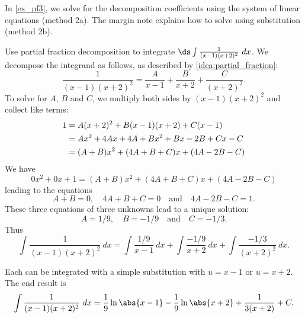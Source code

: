 In \autoref{ex_pf3}, we solve for the decomposition coefficients using the system of linear equations (method 2a). The margin note explains how to solve using substitution (method 2b).

\begin{example}\label{ex_pf3}
Use partial fraction decomposition to integrate $\ds\int\frac{1}{(x-1)(x+2)^2}\ dx$.
\solution
We decompose the integrand as follows, as described by \autoref{idea:partial_fraction}:
\begin{equation}\label{eq:decomp3}
 \frac{1}{(x-1)(x+2)^2} = \frac{A}{x-1} + \frac{B}{x+2} + \frac{C}{(x+2)^2}.
\end{equation}
To solve for $A$, $B$ and $C$, we multiply both sides by $(x-1)(x+2)^2$ and collect like terms:
%
%
\begin{align}
	1
	&= A(x+2)^2 + B(x-1)(x+2) + C(x-1)\label{eq:pf3}\\
	&= Ax^2+4Ax+4A + Bx^2 + Bx-2B + Cx-C \notag \\
	&= (A+B)x^2 + (4A+B+C)x + (4A-2B-C)\notag
\end{align}
We have
\[0x^2+0x+ 1 = (A+B)x^2 + (4A+B+C)x + (4A-2B-C)\]
leading to the equations 
\[A+B = 0, \quad 4A+B+C = 0 \quad \text{and} \quad 4A-2B-C = 1.\]
These three equations of three unknowns lead to a unique solution:
\[A = 1/9,\quad B = -1/9 \quad \text{and} \quad C = -1/3.\]
Thus 
\[\int\frac{1}{(x-1)(x+2)^2}\ dx = \int \frac{1/9}{x-1}\ dx + \int \frac{-1/9}{x+2}\ dx + \int \frac{-1/3}{(x+2)^2}\ dx.\]

Each can be integrated with a simple substitution with $u=x-1$ or $u=x+2$.
The end result is
\[\int\frac{1}{(x-1)(x+2)^2}\ dx = \frac19\ln\abs{x-1}-\frac19\ln\abs{x+2} +\frac1{3(x+2)}+C.\]
\end{example}

